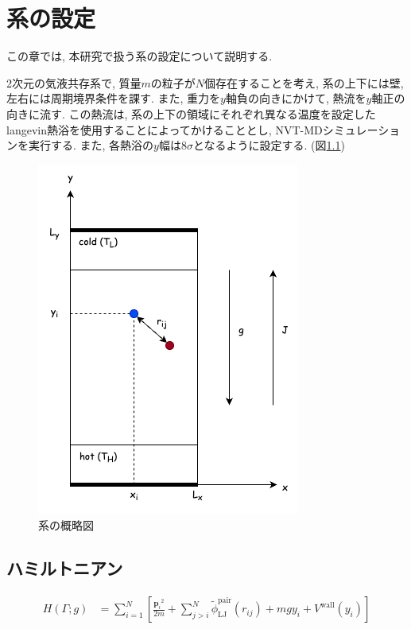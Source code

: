 \chapter{系の設定}\label{chap:system}

この章では, 本研究で扱う系の設定について説明する. 

2次元の気液共存系で, 質量$m$の粒子が$N$個存在することを考え, 系の上下には壁, 左右には周期境界条件を課す. また, 重力を$y$軸負の向きにかけて, 熱流を$y$軸正の向きに流す. この熱流は, 系の上下の領域にそれぞれ異なる温度を設定したlangevin熱浴を使用することによってかけることとし, NVT-MDシミュレーションを実行する. また, 各熱浴の$y$幅は$8\sigma$となるように設定する. (図\ref{fig:system})


\begin{figure}[H]
  \centering
  \caption{系の概略図}
  \label{fig:system}
  \includegraphics[scale=0.5]{image/system_pair.png}
\end{figure}

\section{ハミルトニアン}

\begin{align}
  \label{Hamiltonian}
  H(\Gamma; g)
  &= \sum_{i=1}^{N}
  \left[
    \frac{{\bm{p}_i}^2}{2m} 
    + \sum_{j > i}^{N}
      \tilde{\phi}_{\text{LJ}}^{\text{pair}}(r_{ij})
    + mgy_i
    + V^{\text{wall}} (y_i)
  \right] 
\end{align}

